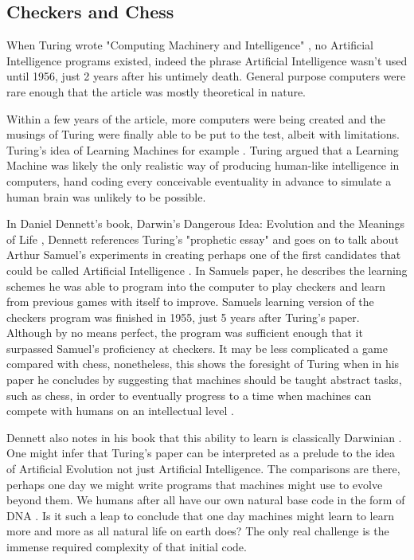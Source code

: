 \documentclass{scrartcl}
\begin{document}
\subsection{Checkers and Chess}

When Turing wrote "Computing Machinery and Intelligence" \cite{turing1950computing:1}, no Artificial Intelligence programs existed, indeed the phrase Artificial Intelligence wasn't used until 1956, just 2 years after his untimely death. General purpose computers were rare enough that the article was mostly theoretical in nature. \par
Within a few years of the article, more computers were being created and the musings of Turing were finally able to be put to the test, albeit with limitations. Turing's idea of Learning Machines for example \cite{ramscar2010computing:9}. Turing argued that a Learning Machine was likely the only realistic way of producing human-like intelligence in computers, hand coding every conceivable eventuality in advance to simulate a human brain was unlikely to be possible. 

In Daniel Dennett's book, Darwin's Dangerous Idea: Evolution and the Meanings of Life \cite[p.207-212]{dennett1996darwin:10}, Dennett references Turing's "prophetic essay" and goes on to talk about Arthur Samuel's experiments in creating perhaps one of the first candidates that could be called Artificial Intelligence \cite{samuel2000some:11}. In Samuels paper, he describes the learning schemes he was able to program into the computer to play checkers and learn from previous games with itself to improve. Samuels learning version of the checkers program was finished in 1955, just 5 years after Turing's paper. Although by no means perfect, the program was sufficient enough that it surpassed Samuel's proficiency at checkers. It may be less complicated a game compared with chess, nonetheless, this shows the foresight of Turing when in his paper he concludes by suggesting that machines should be taught abstract tasks, such as chess, in order to eventually progress to a time when machines can compete with humans on an intellectual level \cite[p.26-30]{dawkins2016selfish:12}. 

Dennett also notes in his book that this ability to learn is classically Darwinian \cite{darwin2009origin:13}. One might infer that Turing's paper can be interpreted as a prelude to the idea of Artificial Evolution not just Artificial Intelligence. The comparisons are there, perhaps one day we might write programs that machines might use to evolve beyond them. We humans after all have our own natural base code in the form of DNA \cite[p.66-68]{dawkins2016selfish:12}. Is it such a leap to conclude that one day machines might learn to learn more and more as all natural life on earth does? The only real challenge is the immense required complexity of that initial code.
\end{document}
